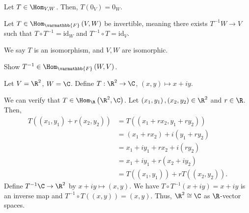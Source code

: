 \documentclass[10pt]{mypackage}
\renewcommand*{\mathbb}[1]{\varmathbb{#1}}
\begin{document}
\begin{lemma}
  Let $T\in \Hom_{V,W}$. Then, $T\left(0_V\right) = 0_W$.
\end{lemma}
\begin{definition}[Isomorphism]
  Let $T\in \Hom_{\mathbb{F}}\left(V,W\right)$ be invertible, meaning there exists $T^{-1}W\rightarrow V$ such that $T\circ T^{-1} = \text{id}_{W}$ and $T^{-1}\circ T = \text{id}_{V}$.\newline

  We say $T$ is an isomorphism, and $V,W$ are isomorphic.
\end{definition}
\begin{exercise}
  Show $T^{-1}\in \Hom_{\mathbb{F}}\left(W,V\right)$.
\end{exercise}
\begin{example}[$\R^2$ and $\C$]
  Let $V = \R^2$, $W = \C$. Define $T: \R^2\rightarrow \C$, $(x,y)\mapsto x + iy$.\newline

  We can verify that $T\in \Hom_{\R}\left(\R^2,\C\right)$. Let $\left(x_1,y_1\right),\left(x_2,y_2\right)\in \R^2$ and $r\in \R$. Then,
  \begin{align*}
    T\left(\left(x_1,y_1\right) + r\left(x_2,y_2\right)\right) &= T\left(\left(x_1 + rx_2,y_1 + ry_2\right)\right)\\
                                                               &= \left(x_1 + rx_2\right) + i\left(y_1 + ry_2\right)\\
                                                               &= x_1 + iy_1 + rx_2 + i\left(ry_2\right)\\
                                                               &= x_1 + iy_1 + r\left(x_2 + iy_2\right)\\
                                                               &= T\left(\left(x_1,y_1\right)\right) + rT\left(\left(x_2,y_2\right)\right).
  \end{align*}
  Define $T^{-1}\C \rightarrow \R^2$ by $x + iy \mapsto (x,y)$. We have $T\circ T^{-1}\left(x + iy\right) = x+iy$ is an inverse map and $T^{-1}\circ T\left(\left(x,y\right)\right) = \left(x,y\right)$. Thus, $\R^2\cong \C$ as $\R$-vector spaces.
\end{example}
\end{document}
